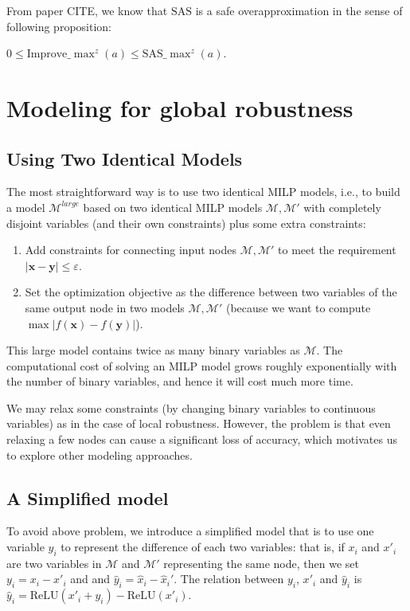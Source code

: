 \documentclass{llncs}
\newcommand{\Improve}{\mathrm{Improve}}
\newcommand{\Utility}{\mathrm{SAS}}
\newcommand{\ReLU}{\mathrm{ReLU}}
\begin{document}
	From paper CITE, we know that $\Utility$ is a safe overapproximation in the sense of following proposition:
	
	\begin{proposition}
		$0 \leq \Improve\_\max^z(a) \leq \Utility\_\max^z(a)$. 
	\end{proposition}
	
	
	\section{Modeling for global robustness}
	

	
	\subsection{Using Two Identical Models}
	The most straightforward way is to use two identical MILP models, i.e., to build a model $\mathcal{M}^{large}$ based on two identical MILP models $\mathcal{M},\mathcal{M}'$ with completely disjoint variables (and their own constraints) plus some extra constraints:
	\begin{enumerate}
		\item Add constraints for connecting input nodes $\mathcal{M},\mathcal{M}'$ to meet the requirement $|\boldsymbol{x}-\boldsymbol{y}| \leq \varepsilon$.
		\item Set the optimization objective as the difference between two variables of the same output node in two models $\mathcal{M},\mathcal{M}'$ (because we want to compute $\max|f(\boldsymbol{x}) -f(\boldsymbol{y}) |$).
	\end{enumerate}
	This large model contains twice as many binary variables as $\mathcal{M}$. The computational cost of solving an MILP model grows roughly exponentially with the number of binary variables, and hence it will cost much more time.
	
We may relax some constraints (by changing binary variables to continuous variables) as in the case of local robustness. However, the problem is that even relaxing a few nodes can cause a significant loss of accuracy, which motivates us to explore other modeling approaches.
	
	\subsection{A Simplified model}
	
	To avoid above problem, we introduce a simplified model that is to use one variable $y_i$ to represent the difference of each two variables: that is, if $x_i$ and $x'_i$ are two variables in $\mathcal{M}$ and $\mathcal{M}'$ representing the same node, then we set $y_i=x_i-x'_i$ and and $\hat{y}_i=\hat{x}_i-\hat{x}_i'$. The relation between $y_i$, $x'_i$ and $\hat{y}_i$ is $\hat{y}_i = \ReLU(x'_i+y_i)-\ReLU(x'_i).$ 
	
\end{document}
